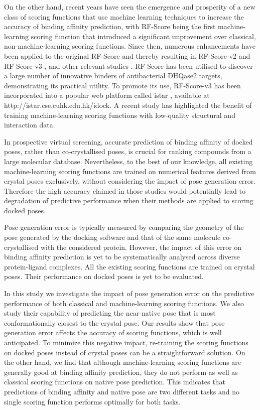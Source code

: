 \documentclass[twocolumn]{bmcart}
\begin{document}
On the other hand, recent years have seen the emergence and prosperity of a new class of scoring functions that use machine learning techniques to increase the accuracy of binding affinity prediction, with RF-Score \cite{564} being the first machine-learning scoring function that introduced a significant improvement over classical, non-machine-learning scoring functions. Since then, numerous enhancements have been applied to the original RF-Score \cite{564} and thereby resulting in RF-Score-v2 \cite{1370} and RF-Score-v3 \cite{1647}, and other relevant studies \cite{1432}. RF-Score has been utilised \cite{1281} to discover a large number of innovative binders of antibacterial DHQase2 targets, demonstrating its practical utility. To promote its use, RF-Score-v3 has been incorporated into a popular web platform called istar \cite{1362}, available at http://istar.cse.cuhk.edu.hk/idock. A recent study \cite{1663} has highlighted the benefit of training machine-learning scoring functions with low-quality structural and interaction data.

In prospective virtual screening, accurate prediction of binding affinity of docked poses, rather than co-crystallised poses, is crucial for ranking compounds from a large molecular database. Nevertheless, to the best of our knowledge, all existing machine-learning scoring functions are trained on numerical features derived from crystal poses exclusively, without considering the impact of pose generation error. Therefore the high accuracy claimed in those studies would potentially lead to degradation of predictive performance when their methods are applied to scoring docked poses.

Pose generation error is typically measured by comparing the geometry of the pose generated by the docking software and that of the same molecule co-crystallised with the considered protein. However, the impact of this error on binding affinity prediction is yet to be systematically analysed across diverse protein-ligand complexes. All the existing scoring functions are trained on crystal poses. Their performance on docked poses is yet to be evaluated.

In this study we investigate the impact of pose generation error on the predictive performance of both classical and machine-learning scoring functions. We also study their capability of predicting the near-native pose that is most conformationally closest to the crystal pose. Our results show that pose generation error affects the accuracy of scoring functions, which is well anticipated. To minimize this negative impact, re-training the scoring functions on docked poses instead of crystal poses can be a straightforward solution. On the other hand, we find that although machine-learning scoring functions are generally good at binding affinity prediction, they do not perform as well as classical scoring functions on native pose prediction. This indicates that predictions of binding affinity and native pose are two different tasks and no single scoring function performs optimally for both tasks.
\end{document}
